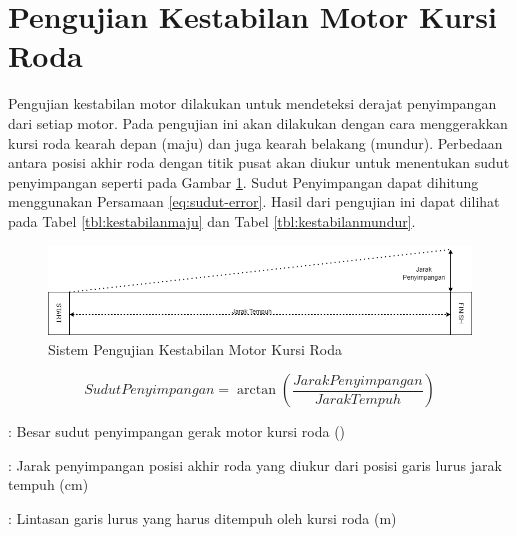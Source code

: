   \newpage

\section{Pengujian Kestabilan Motor Kursi Roda}

Pengujian kestabilan motor dilakukan untuk mendeteksi derajat penyimpangan dari setiap motor. Pada pengujian ini akan dilakukan dengan cara menggerakkan kursi roda kearah depan (maju) dan juga kearah belakang (mundur). Perbedaan antara posisi akhir roda dengan titik pusat akan diukur untuk menentukan sudut penyimpangan seperti pada Gambar \ref{fig:PengujianKestabilanMotor}. Sudut Penyimpangan dapat dihitung menggunakan Persamaan \ref{eq:sudut-error}. Hasil dari pengujian ini dapat dilihat pada Tabel \ref{tbl:kestabilanmaju} dan Tabel \ref{tbl:kestabilanmundur}.

\begin{figure} [ht] \centering
  \includegraphics[scale=0.55]{gambar/program/Sudut Penyimpangan.png}
  \caption{Sistem Pengujian Kestabilan Motor Kursi Roda}
  \label{fig:PengujianKestabilanMotor}
\end{figure}

\begin{equation}
  \label{eq:sudut-error}
  Sudut Penyimpangan = \arctan \left ( \frac{Jarak Penyimpangan}{Jarak Tempuh} \right )
\end{equation}

\begin{description}[nolistsep]
  \item[Keterangan]
  \item[Sudut Penyimpangan] : Besar sudut penyimpangan gerak motor kursi roda (\textdegree)
  \item[Jarak Penyimpangan] : Jarak penyimpangan posisi akhir roda yang diukur dari posisi garis lurus jarak tempuh (cm)
  \item[Jarak Tempuh] : Lintasan garis lurus yang harus ditempuh oleh kursi roda (m)
\end{description}


